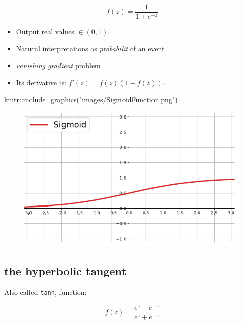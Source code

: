 \documentclass[
  letterpaper,
  DIV=11,
  numbers=noendperiod]{scrartcl}
\newenvironment{Shaded}{\begin{snugshade}}{\end{snugshade}}
\newcommand{\FunctionTok}[1]{\textcolor[rgb]{0.28,0.35,0.67}{#1}}
\newcommand{\NormalTok}[1]{\textcolor[rgb]{0.00,0.23,0.31}{#1}}
\newcommand{\SpecialCharTok}[1]{\textcolor[rgb]{0.37,0.37,0.37}{#1}}
\newcommand{\StringTok}[1]{\textcolor[rgb]{0.13,0.47,0.30}{#1}}
\begin{document}
\[
f(z)=\frac{1}{1+e^{-z}}
\]

\begin{itemize}
\item
  Output real values \(\in (0,1)\).
\item
  Natural interpretations as \emph{probabilit} of an event
\item
  \emph{vanishing gradient} problem
\item
  Its derivative is: \(f'(z)=f(z)(1-f(z))\).
\end{itemize}

\begin{Shaded}
\begin{Highlighting}[]
\NormalTok{knitr}\SpecialCharTok{::}\FunctionTok{include\_graphics}\NormalTok{(}\StringTok{"images/SigmoidFunction.png"}\NormalTok{)}
\end{Highlighting}
\end{Shaded}

\begin{figure}[H]

{\centering \includegraphics[width=1\textwidth,height=\textheight]{images/SigmoidFunction.png}

}

\end{figure}

\hypertarget{the-hyperbolic-tangent}{%
\subsection{the hyperbolic tangent}\label{the-hyperbolic-tangent}}

Also called \texttt{tanh}, function:

\[
f(z)=\frac{e^{z}-e^{-z}}{e^{z}+e^{-z}}
\]
\end{document}
